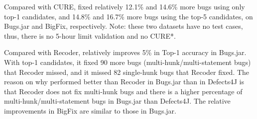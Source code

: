 Compared with CURE, {\tool} fixed relatively 12.1\% and 14.6\% more
bugs using only top-1 candidates, and 14.8\% and 16.7\% more bugs using
the top-5 candidates,
on Bugs.jar and BigFix, respectively. Note: these two datasets have no
test cases, thus, there is no 5-hour limit validation and no CURE*.

Compared with Recoder, {\tool} relatively improves 5\% in Top-1
accuracy in Bugs.jar. With top-1 candidates, it fixed 90 more bugs
(multi-hunk/multi-statement bugs) that Recoder missed, and it missed
82 single-hunk bugs that Recoder fixed. The reason on why {\tool}
performed better than Recoder in Bugs.jar than in Defects4J is that
Recoder does not fix multi-hunk bugs and there is a higher percentage
of multi-hunk/multi-statement bugs in Bugs.jar than Defects4J. The
relative improvements in BigFix are similar to those in Bugs.jar.
